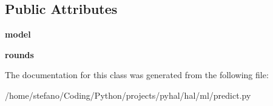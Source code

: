 \subsection*{Public Attributes}
\begin{DoxyCompactItemize}
\item 
{\bfseries model}\hypertarget{classhal_1_1ml_1_1predict_1_1_base_prediction_a78a5950426761d76607463957e6d7b5f}{}\label{classhal_1_1ml_1_1predict_1_1_base_prediction_a78a5950426761d76607463957e6d7b5f}

\item 
{\bfseries rounds}\hypertarget{classhal_1_1ml_1_1predict_1_1_base_prediction_a706bdbfbad676c63b8755e43189d706f}{}\label{classhal_1_1ml_1_1predict_1_1_base_prediction_a706bdbfbad676c63b8755e43189d706f}

\end{DoxyCompactItemize}


The documentation for this class was generated from the following file\+:\begin{DoxyCompactItemize}
\item 
/home/stefano/\+Coding/\+Python/projects/pyhal/hal/ml/predict.\+py\end{DoxyCompactItemize}
